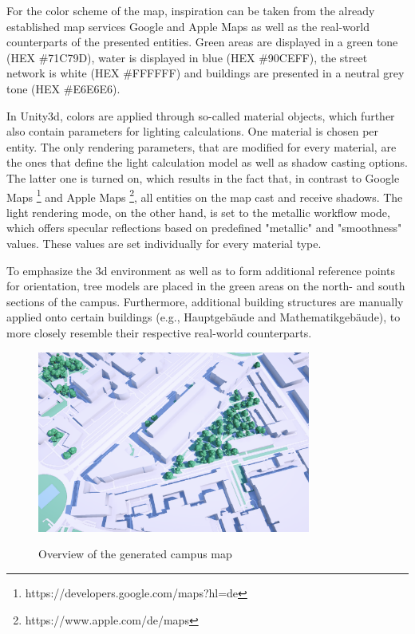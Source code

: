 For the color scheme of the map, inspiration can be taken from the already established map services Google and Apple Maps as well as the real-world counterparts of the presented entities. Green areas are displayed in a green tone (HEX \#71C79D), water is displayed in blue (HEX \#90CEFF), the street network is white (HEX \#FFFFFF) and buildings are presented in a neutral grey tone (HEX \#E6E6E6).

In Unity3d, colors are applied through so-called material objects, which further also contain parameters for lighting calculations. One material is chosen per entity. The only rendering parameters, that are modified for every material, are the ones that define the light calculation model as well as shadow casting options. The latter one is turned on, which results in the fact that, in contrast to Google Maps \footnote{https://developers.google.com/maps?hl=de} and Apple Maps \footnote{https://www.apple.com/de/maps}, all entities on the map cast and receive shadows. The light rendering mode, on the other hand, is set to the metallic workflow mode, which offers specular reflections based on predefined "metallic" and "smoothness" values. These values are set individually for every material type.

To emphasize the 3d environment as well as to form additional reference points for orientation, tree models are placed in the green areas on the north- and south sections of the campus. Furthermore, additional building structures are manually applied onto certain buildings (e.g., Hauptgebäude and Mathematikgebäude), to more closely resemble their respective real-world counterparts.

\begin{figure}[H]
	\centering
	\includegraphics[width=0.8\textwidth]{images/generated_campus_map.png}\\
	\caption{Overview of the generated campus map}
\end{figure}

